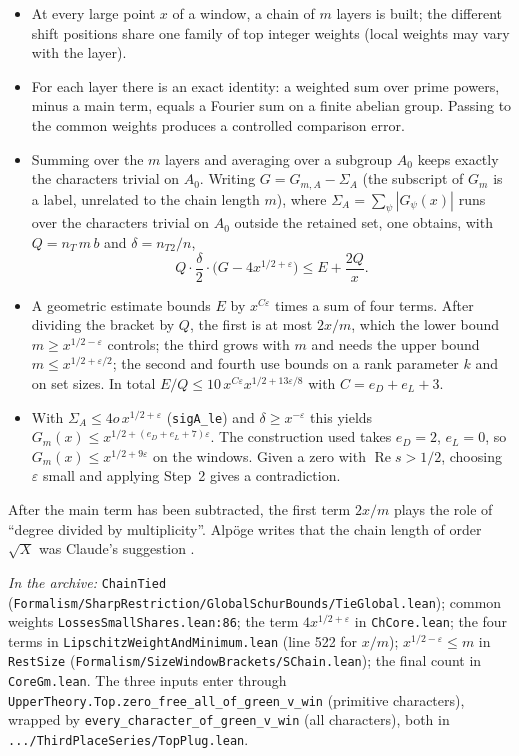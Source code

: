 \documentclass[11pt]{article}
\newcommand{\Lean}[1]{\texttt{\small #1}}
\newcommand{\inarch}[1]{\par{\small\raggedright\noindent\emph{In the archive:} #1\par}}
\renewcommand{\Re}{\operatorname{Re}}
\begin{document}
\begin{itemize}
\item At every large point $x$ of a window, a chain of $m$ layers is built; the different shift positions share one family of top integer weights (local weights may vary with the layer).
\item For each layer there is an exact identity: a weighted sum over prime powers, minus a main term, equals a Fourier sum on a finite abelian group. Passing to the common weights produces a controlled comparison error.
\item Summing over the $m$ layers and averaging over a subgroup $A_0$ keeps exactly the characters trivial on $A_0$. Writing $G=G_{m,A}-\Sigma_A$ (the subscript of $G_m$ is a label, unrelated to the chain length $m$), where $\Sigma_A=\sum_\psi|G_\psi(x)|$ runs over the characters trivial on $A_0$ outside the retained set, one obtains, with $Q=n_T\,m\,b$ and $\delta=n_{T2}/n$,
\[
Q\cdot\frac\delta2\cdot\bigl(G-4x^{1/2+\varepsilon}\bigr)\le E+\frac{2Q}{x}.
\]
\item A geometric estimate bounds $E$ by $x^{C\varepsilon}$ times a sum of four terms. After dividing the bracket by $Q$, the first is at most $2x/m$, which the lower bound $m\ge x^{1/2-\varepsilon}$ controls; the third grows with $m$ and needs the upper bound $m\le x^{1/2+\varepsilon/2}$; the second and fourth use bounds on a rank parameter $k$ and on set sizes. In total $E/Q\le 10\,x^{C\varepsilon}x^{1/2+13\varepsilon/8}$ with $C=e_D+e_L+3$.
\item With $\Sigma_A\le 4o\,x^{1/2+\varepsilon}$ (\Lean{sigA\_le}) and $\delta\ge x^{-\varepsilon}$ this yields $G_m(x)\le x^{1/2+(e_D+e_L+7)\varepsilon}$. The construction used takes $e_D=2$, $e_L=0$, so $G_m(x)\le x^{1/2+9\varepsilon}$ on the windows. Given a zero with $\Re s>1/2$, choosing $\varepsilon$ small and applying Step~2 gives a contradiction.
\end{itemize}

After the main term has been subtracted, the first term $2x/m$ plays the role of ``degree divided by multiplicity''. Alp\"oge writes that the chain length of order $\sqrt X$ was Claude's suggestion \cite{alpoge}.

\inarch{\Lean{ChainTied} (\Lean{Formalism/SharpRestriction/GlobalSchurBounds/TieGlobal.lean}); common weights \Lean{LossesSmallShares.lean:86}; the term $4x^{1/2+\varepsilon}$ in \Lean{ChCore.lean}; the four terms in \Lean{LipschitzWeightAndMinimum.lean} (line 522 for $x/m$); $x^{1/2-\varepsilon}\le m$ in \Lean{RestSize} (\Lean{Formalism/SizeWindowBrackets/SChain.lean}); the final count in \Lean{CoreGm.lean}. The three inputs enter through \Lean{UpperTheory.Top.zero\_free\_all\_of\_green\_v\_win} (primitive characters), wrapped by \Lean{every\_character\_of\_green\_v\_win} (all characters), both in \Lean{.../ThirdPlaceSeries/TopPlug.lean}.}
\end{document}
